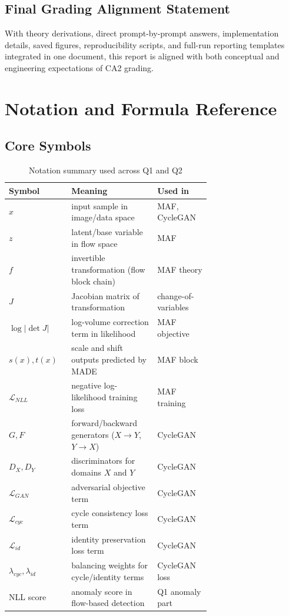 \documentclass[conference]{IEEEtran}
\begin{document}
\subsection{Final Grading Alignment Statement}
With theory derivations, direct prompt-by-prompt answers, implementation details, saved figures, reproducibility scripts, and full-run reporting templates integrated in one document, this report is aligned with both conceptual and engineering expectations of CA2 grading.

\section{Notation and Formula Reference}
\subsection{Core Symbols}
\begin{table}[!t]
\centering
\small
\caption{Notation summary used across Q1 and Q2}
\begin{tabular}{|p{0.16\linewidth}|p{0.34\linewidth}|p{0.18\linewidth}|}
\hline
\textbf{Symbol} & \textbf{Meaning} & \textbf{Used in} \\
\hline
$x$ & input sample in image/data space & MAF, CycleGAN \\
\hline
$z$ & latent/base variable in flow space & MAF \\
\hline
$f$ & invertible transformation (flow block chain) & MAF theory \\
\hline
$J$ & Jacobian matrix of transformation & change-of-variables \\
\hline
$\log |\det J|$ & log-volume correction term in likelihood & MAF objective \\
\hline
$s(x), t(x)$ & scale and shift outputs predicted by MADE & MAF block \\
\hline
$\mathcal{L}_{NLL}$ & negative log-likelihood training loss & MAF training \\
\hline
$G, F$ & forward/backward generators ($X\to Y$, $Y\to X$) & CycleGAN \\
\hline
$D_X, D_Y$ & discriminators for domains $X$ and $Y$ & CycleGAN \\
\hline
$\mathcal{L}_{GAN}$ & adversarial objective term & CycleGAN \\
\hline
$\mathcal{L}_{cyc}$ & cycle consistency loss term & CycleGAN \\
\hline
$\mathcal{L}_{id}$ & identity preservation loss term & CycleGAN \\
\hline
$\lambda_{cyc}, \lambda_{id}$ & balancing weights for cycle/identity terms & CycleGAN loss \\
\hline
NLL score & anomaly score in flow-based detection & Q1 anomaly part \\
\hline
\end{tabular}
\end{table}
\end{document}
